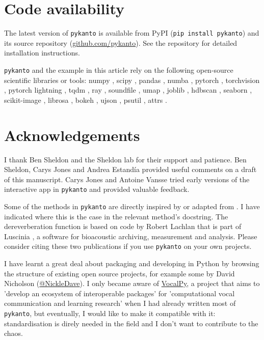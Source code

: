 \section{Code availability}

The latest version of \texttt{pykanto} is available from PyPI (\texttt{pip install
pykanto}) and its source repository (\href{https://github.com/nilomr/pykanto}{github.com/pykanto}). See the repository for detailed installation instructions.

\noindent \texttt{pykanto} and the example in this article rely on the following open-source scientific
libraries or tools: numpy \parencite{numpy2020}, scipy \parencite{scipy2020}, pandas
\parencite{pandas2023}, numba \parencite{lam2015}, pytorch \parencite{pytorch2019},
torchvision \parencite{torchvision2016}, pytorch lightning
\parencite{pytorchlightning2019}, tqdm \parencite{tqdm2019}, ray \parencite{moritz2018},
soundfile \parencite{bechtold2022}, umap \parencite{mcinnes2018},  joblib
\parencite{joblib2020}, hdbscan \parencite{mcinnes2017}, seaborn \parencite{Waskom2021},
scikit-image \parencite{scikitimage2014}, librosa \parencite{mcfee2015}, bokeh
\parencite{bokeh2018}, ujson \parencite{ujason2023}, psutil \parencite{psutil2023}, attrs
\parencite{schlawack2019}.

\section{Acknowledgements}

I thank Ben Sheldon and the Sheldon lab for their support and
patience. Ben Sheldon, Carys Jones and Andrea Estandía provided useful comments on a draft of this
manuscript. Carys Jones and Antoine Vansse tried early versions of the
interactive app in \texttt{pykanto} and provided valuable feedback.

Some of the methods in \texttt{pykanto} are directly inspired by or adapted
from \cite{sainburg2020}. I have indicated where
this is the case in the relevant method's docstring. The dereverberation
function is based on code by Robert Lachlan that is part of Luscinia
\parencite{lachlan2016a}, a software for bioacoustic archiving, measurement and
analysis. Please consider citing these two publications if you use
\texttt{pykanto} on your own projects.

I have learnt a great deal about packaging and developing in Python by browsing
the structure of existing open source projects, for example some by David
Nicholson (\href{https://github.com/NickleDave/NickleDave}{@NickleDave}). I only
became aware of \href{https://github.com/vocalpy}{VocalPy}, a project that aims
to 'develop an ecosystem of interoperable packages' for
'computational vocal communication and learning research' when I had
already written most of \texttt{pykanto}, but eventually, I would like to make it
compatible with it: standardisation is direly needed in the field and I don't
want to contribute to the chaos.

